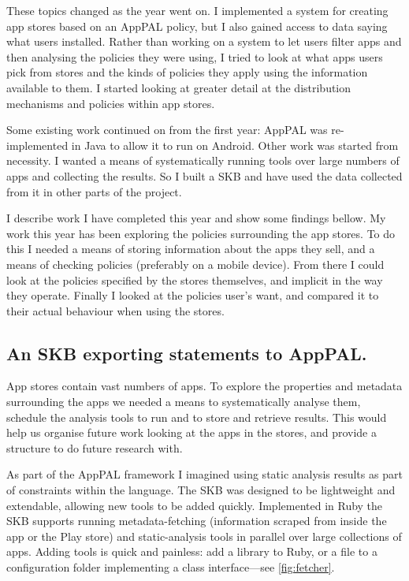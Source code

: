 \documentclass[a4paper]{scrartcl}
\begin{document}
These topics changed as the year went on.
I implemented a system for creating app stores based on an AppPAL policy, but I also gained access to data saying what users installed.
Rather than working on a system to let users filter apps and then analysing the policies they were using, I tried to look at what apps users pick from stores and the kinds of policies they apply using the information available to them.
I started looking at greater detail at the distribution mechanisms and policies within app stores.

Some existing work continued on from the first year: AppPAL was re-implemented in Java to allow it to run on Android.
Other work was started from necessity.
I wanted a means of systematically running tools over large numbers of apps and collecting the results.
So I built a \ac{SKB}  and have used the data collected from it in other parts of the project.

I describe work I have completed this year and show some findings bellow.
My work this year has been exploring the policies surrounding the app stores.
To do this I needed a means of storing information about the apps they sell, and a means of checking policies (preferably on a mobile device).
From there I could look at the policies specified by the stores themselves, and implicit in the way they operate.
Finally I looked at the policies user's want, and compared it to their actual behaviour when using the stores.

\subsection{An \ac{SKB} exporting statements to AppPAL.}

App stores contain vast numbers of apps.
To explore the properties and metadata surrounding the apps we needed a means to systematically analyse them, schedule the analysis tools to run and to store and retrieve results.
This would help us organise future work looking at the apps in the stores, and provide a structure to do future research with.

As part of the AppPAL framework I imagined using static analysis results as part of constraints within the language.
The \ac{SKB} was designed to be lightweight and extendable, allowing new tools to be added quickly.
Implemented in Ruby the \ac{SKB} supports running metadata-fetching (information scraped from inside the app or the Play store) and static-analysis tools in parallel over large collections of apps.
Adding tools is quick and painless: add a library to Ruby, or a file to a configuration folder implementing a class interface---see \autoref{fig:fetcher}.
\end{document}
